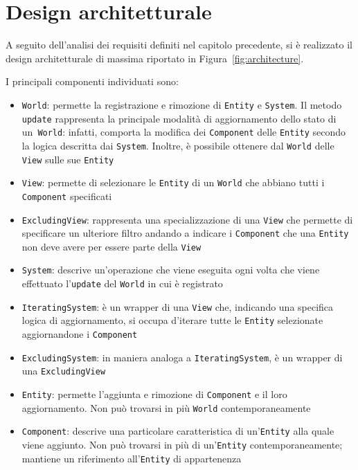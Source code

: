 \chapter{Design architetturale}\label{ch:design-architetturale}
A seguito dell'analisi dei requisiti definiti nel capitolo precedente, si è realizzato il design architetturale
di massima riportato in Figura~\ref{fig:architecture}.

I principali componenti individuati sono:
\begin{itemize}
    \item \texttt{World}: permette la registrazione e rimozione di \texttt{Entity} e \texttt{System}.
    Il metodo \texttt{update} rappresenta la principale modalità di aggiornamento dello stato di un~\texttt{World}:
    infatti, comporta la modifica dei \texttt{Component} delle \texttt{Entity} secondo la logica descritta dai
    \texttt{System}.
    Inoltre, è possibile ottenere dal \texttt{World} delle \texttt{View} sulle sue \texttt{Entity}
    \item \texttt{View}: permette di selezionare le \texttt{Entity} di un \texttt{World} che abbiano tutti i
    \texttt{Component} specificati
    \item \texttt{ExcludingView}: rappresenta una specializzazione di una \texttt{View} che permette di specificare un
    ulteriore filtro andando a indicare i \texttt{Component} che una \texttt{Entity} non deve avere per essere parte
    della \texttt{View}
    \item \texttt{System}: descrive un'operazione che viene eseguita ogni volta che viene effettuato l'\texttt{update}
    del \texttt{World} in cui è registrato
    \item \texttt{IteratingSystem}: è un wrapper di una \texttt{View} che, indicando una specifica logica di
    aggiornamento, si occupa d'iterare tutte le \texttt{Entity} selezionate aggiornandone i \texttt{Component}
    \item \texttt{ExcludingSystem}: in maniera analoga a \texttt{IteratingSystem}, è un wrapper di una
    \texttt{ExcludingView}
    \item \texttt{Entity}: permette l'aggiunta e rimozione di \texttt{Component} e il loro aggiornamento.
    Non può trovarsi in più \texttt{World} contemporaneamente
    \item \texttt{Component}: descrive una particolare caratteristica di un'\texttt{Entity} alla quale viene aggiunto.
    Non può trovarsi in più di un'\texttt{Entity} contemporaneamente;
    mantiene un riferimento all'\texttt{Entity} di appartenenza
\end{itemize}

